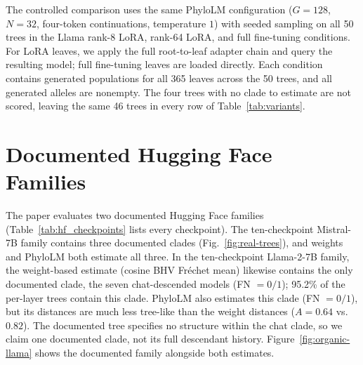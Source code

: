 \documentclass{article}
\theoremstyle{definition}
\theoremstyle{plain}
\begin{document}
The controlled comparison uses the same PhyloLM configuration ($G=128$, $N=32$, four-token
continuations, temperature $1$) with seeded sampling on all 50 trees in the Llama
rank-8 LoRA, rank-64 LoRA, and full fine-tuning conditions. For LoRA leaves, we apply the full
root-to-leaf adapter chain and query the resulting model; full fine-tuning leaves are loaded directly. Each condition
contains generated populations for all 365 leaves across the 50 trees, and all generated alleles are
nonempty. The four trees with no clade to estimate are not scored, leaving the same 46 trees in every row of Table~\ref{tab:variants}.

\section{Documented Hugging Face Families}
\label{app:organic-additional}

The paper evaluates two documented Hugging Face families (Table~\ref{tab:hf_checkpoints} lists every checkpoint). The ten-checkpoint Mistral-7B family
contains three documented clades (Fig.~\ref{fig:real-trees}), and weights and PhyloLM both estimate
all three. In the ten-checkpoint Llama-2-7B family, the weight-based estimate (cosine BHV Fr\'echet mean) likewise contains
the only documented clade, the seven chat-descended models (FN $=0/1$); 95.2\% of the per-layer trees contain this clade. PhyloLM also estimates this clade (FN $=0/1$), but its
distances are much less tree-like than the weight distances ($A=0.64$ vs.\ $0.82$).
The documented tree specifies no structure within the chat clade, so we claim one documented clade, not its full descendant history. Figure~\ref{fig:organic-llama}
shows the documented family alongside both estimates.
\end{document}
